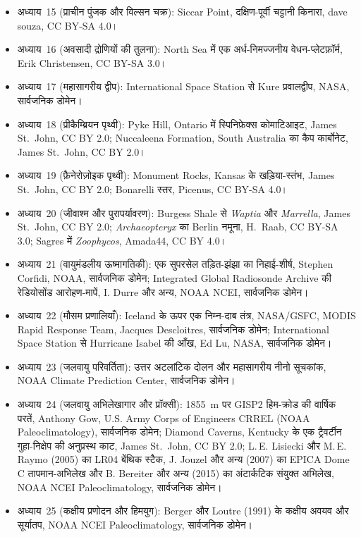 \begin{itemize}
  \item अध्याय~15 (प्राचीन पुंजक और विल्सन चक्र): Siccar Point, दक्षिण-पूर्वी चट्टानी किनारा, dave souza, CC BY-SA 4.0।
  \item अध्याय~16 (अवसादी द्रोणियों की तुलना): North Sea में एक अर्ध-निमज्जनीय वेधन-प्लेटफ़ॉर्म, Erik Christensen, CC BY-SA 3.0।
  \item अध्याय~17 (महासागरीय द्वीप): International Space Station से Kure प्रवालद्वीप, NASA, सार्वजनिक डोमेन।
  \item अध्याय~18 (प्रीकैम्ब्रियन पृथ्वी): Pyke Hill, Ontario में स्पिनिफ़ेक्स कोमाटिआइट, James St.~John, CC BY 2.0; Nuccaleena Formation, South Australia का कैप कार्बोनेट, James St.~John, CC BY 2.0।
  \item अध्याय~19 (फ़ैनेरोज़ोइक पृथ्वी): Monument Rocks, Kansas के खड़िया-स्तंभ, James St.~John, CC BY 2.0; Bonarelli स्तर, Picenus, CC BY-SA 4.0।
  \item अध्याय~20 (जीवाश्म और पुरापर्यावरण): Burgess Shale से \emph{Waptia} और \emph{Marrella}, James St.~John, CC BY 2.0; \emph{Archaeopteryx} का Berlin नमूना, H.~Raab, CC BY-SA 3.0; Sagres में \emph{Zoophycos}, Amada44, CC BY 4.0।
  \item अध्याय~21 (वायुमंडलीय ऊष्मागतिकी): एक सुपरसेल तड़ित-झंझा का निहाई-शीर्ष, Stephen Corfidi, NOAA, सार्वजनिक डोमेन; Integrated Global Radiosonde Archive की रेडियोसोंड आरोहण-मापें, I. Durre और अन्य, NOAA NCEI, सार्वजनिक डोमेन।
  \item अध्याय~22 (मौसम प्रणालियाँ): Iceland के ऊपर एक निम्न-दाब तंत्र, NASA/GSFC, MODIS Rapid Response Team, Jacques Descloitres, सार्वजनिक डोमेन; International Space Station से Hurricane Isabel की आँख, Ed Lu, NASA, सार्वजनिक डोमेन।
  \item अध्याय~23 (जलवायु परिवर्तिता): उत्तर अटलांटिक दोलन और महासागरीय नीनो सूचकांक, NOAA Climate Prediction Center, सार्वजनिक डोमेन।
  \item अध्याय~24 (जलवायु अभिलेखागार और प्रॉक्सी): 1855~m पर GISP2 हिम-क्रोड की वार्षिक परतें, Anthony Gow, U.S. Army Corps of Engineers CRREL (NOAA Paleoclimatology), सार्वजनिक डोमेन; Diamond Caverns, Kentucky के एक ट्रैवर्टीन गुहा-निक्षेप की अनुप्रस्थ काट, James St.~John, CC BY 2.0; L.\,E. Lisiecki और M.\,E. Raymo (2005) का LR04 बेंथिक स्टैक, J. Jouzel और अन्य (2007) का EPICA Dome C तापमान-अभिलेख और B. Bereiter और अन्य (2015) का अंटार्कटिक  संयुक्त अभिलेख, NOAA NCEI Paleoclimatology, सार्वजनिक डोमेन।
  \item अध्याय~25 (कक्षीय प्रणोदन और हिमयुग): Berger और Loutre (1991) के कक्षीय अवयव और सूर्यातप, NOAA NCEI Paleoclimatology, सार्वजनिक डोमेन।

\end{itemize}
